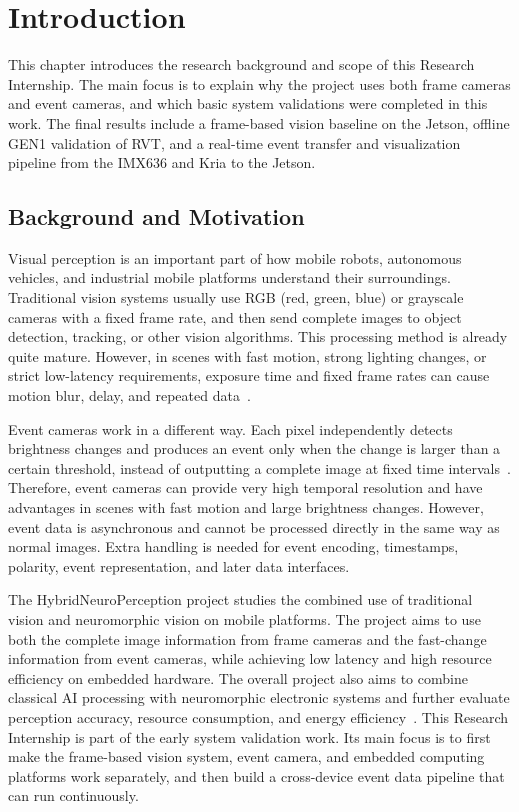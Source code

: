 \chapter{Introduction}

This chapter introduces the research background and scope of this Research Internship. The main focus is to explain why the project uses both frame cameras and event cameras, and which basic system validations were completed in this work. The final results include a frame-based vision baseline on the Jetson, offline GEN1 validation of RVT, and a real-time event transfer and visualization pipeline from the IMX636 and Kria to the Jetson.

\section{Background and Motivation}

Visual perception is an important part of how mobile robots, autonomous vehicles, and industrial mobile platforms understand their surroundings. Traditional vision systems usually use RGB (red, green, blue) or grayscale cameras with a fixed frame rate, and then send complete images to object detection, tracking, or other vision algorithms. This processing method is already quite mature. However, in scenes with fast motion, strong lighting changes, or strict low-latency requirements, exposure time and fixed frame rates can cause motion blur, delay, and repeated data~\parencite{szeliski2022}.

Event cameras work in a different way. Each pixel independently detects brightness changes and produces an event only when the change is larger than a certain threshold, instead of outputting a complete image at fixed time intervals~\parencite{gallego2022}. Therefore, event cameras can provide very high temporal resolution and have advantages in scenes with fast motion and large brightness changes. However, event data is asynchronous and cannot be processed directly in the same way as normal images. Extra handling is needed for event encoding, timestamps, polarity, event representation, and later data interfaces.

The HybridNeuroPerception project studies the combined use of traditional vision and neuromorphic vision on mobile platforms. The project aims to use both the complete image information from frame cameras and the fast-change information from event cameras, while achieving low latency and high resource efficiency on embedded hardware. The overall project also aims to combine classical AI processing with neuromorphic electronic systems and further evaluate perception accuracy, resource consumption, and energy efficiency~\parencite{hybridneuroperceptionGVB2025}. This Research Internship is part of the early system validation work. Its main focus is to first make the frame-based vision system, event camera, and embedded computing platforms work separately, and then build a cross-device event data pipeline that can run continuously.

